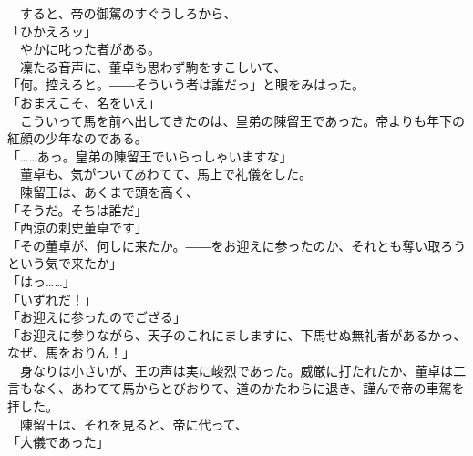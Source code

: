 \documentclass[
  paper=a5,
  fontsize=10pt,
  jafontsize=9.5pt,
  tate,                  %
  open_bracket_pos=nibu, %
]{jlreq}
\begin{document}
　すると、帝の御駕のすぐうしろから、\\


「ひかえろッ」\\


　やかに叱った者がある。\\


　凜たる音声に、董卓も思わず駒をすこしいて、\\


「何。控えろと。――そういう者は誰だっ」と眼をみはった。\\


「おまえこそ、名をいえ」\\


　こういって馬を前へ出してきたのは、皇弟の陳留王であった。帝よりも年下の紅顔の少年なのである。\\


「……あっ。皇弟の陳留王でいらっしゃいますな」\\


　董卓も、気がついてあわてて、馬上で礼儀をした。\\


　陳留王は、あくまで頭を高く、\\


「そうだ。そちは誰だ」\\


「西涼の刺史董卓です」\\


「その董卓が、何しに来たか。――をお迎えに参ったのか、それとも奪い取ろうという気で来たか」\\


「はっ……」\\


「いずれだ！」\\


「お迎えに参ったのでござる」\\


「お迎えに参りながら、天子のこれにましますに、下馬せぬ無礼者があるかっ、なぜ、馬をおりん！」\\


　身なりは小さいが、王の声は実に峻烈であった。威厳に打たれたか、董卓は二言もなく、あわてて馬からとびおりて、道のかたわらに退き、謹んで帝の車駕を拝した。\\


　陳留王は、それを見ると、帝に代って、\\


「大儀であった」\\
\end{document}
